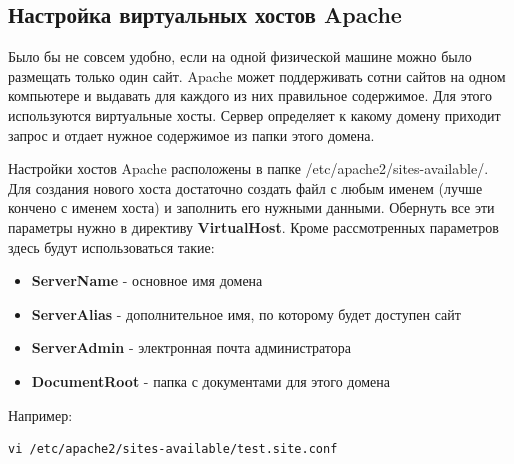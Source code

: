 \documentclass[14pt, a4paper]{article}
\begin{document}
\subsection*{Настройка виртуальных хостов Apache}
Было бы не совсем удобно, если на одной физической машине можно было размещать только один сайт. 
Apache может поддерживать сотни сайтов на одном компьютере и выдавать для каждого из них правильное 
содержимое. Для этого используются виртуальные хосты. Сервер определяет к какому домену приходит 
запрос и отдает нужное содержимое из папки этого домена.

Настройки хостов Apache расположены в папке \linebreak /etc/apache2/sites-available/. Для создания нового хоста 
достаточно создать файл с любым именем (лучше кончено с именем хоста) и заполнить его нужными данными. 
Обернуть все эти параметры нужно в директиву \textbf{VirtualHost}. Кроме рассмотренных параметров здесь 
будут использоваться такие:

\begin{itemize}
    \item \textbf{ServerName} - основное имя домена
    \item \textbf{ServerAlias} - дополнительное имя, по которому будет доступен сайт
    \item \textbf{ServerAdmin} - электронная почта администратора
    \item \textbf{DocumentRoot} - папка с документами для этого домена\\
\end{itemize}

Например:
\begin{lstlisting}
vi /etc/apache2/sites-available/test.site.conf
\end{lstlisting}

\begin{figure}[h]%
    \centering
    \label{1.11}
\end{figure}
\end{document}

